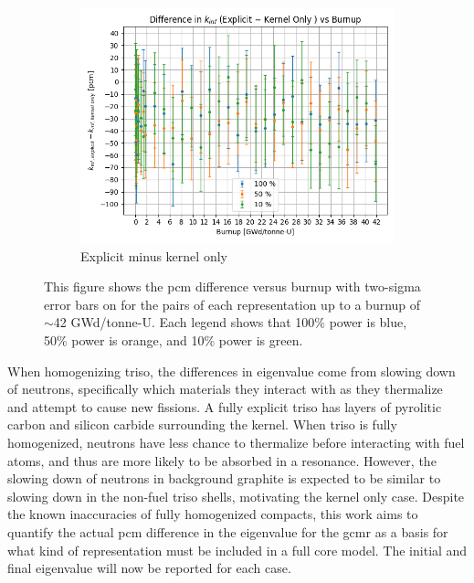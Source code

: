 \documentclass[letterpaper]{physor2024}
\begin{document}
\begin{figure}[!h]
\begin{subfigure}{0.495\linewidth}
        \includegraphics[width=\linewidth]{figures/explicit_minus_kern.png}
        \caption{Explicit minus kernel only}
    \end{subfigure}
    \caption{This figure shows the \gls{pcm} difference versus burnup with two-sigma error bars on \kinf for the pairs of each representation up to a burnup of $\sim$42 GWd/tonne-U. Each legend shows that 100\% power is blue, 50\% power is orange, and 10\% power is green.}
    \vspace*{-0.3cm}
    \label{fig:pcm_diffs}
\end{figure}

When homogenizing \gls{triso}, the differences in eigenvalue come from slowing down of neutrons, specifically which materials they interact with as they thermalize and attempt to cause new fissions. A fully explicit \gls{triso} has layers of pyrolitic carbon and silicon carbide surrounding the kernel. When \gls{triso} is fully homogenized, neutrons have less chance to thermalize before interacting with fuel atoms, and thus are more likely to be absorbed in a resonance. However, the slowing down of neutrons in background graphite is expected to be similar to slowing down in the non-fuel \gls{triso} shells, motivating the kernel only case. Despite the known inaccuracies of fully homogenized compacts, this work aims to quantify the actual \gls{pcm} difference in the eigenvalue for the \gls{gcmr} as a basis for what kind of representation must be included in a full core model. The initial and final eigenvalue will now be reported for each case.
\end{document}
